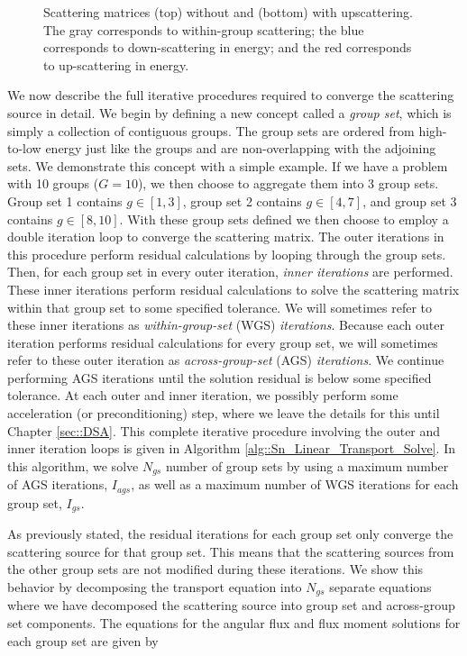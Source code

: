 \begin{figure}
\begin{subfigure}[b]{0.58\textwidth}
	\end{subfigure}
\caption[Scattering matrices with and without upscattering]{Scattering matrices (top) without and (bottom) with upscattering. The gray corresponds to within-group scattering; the blue corresponds to down-scattering in energy; and the red corresponds to up-scattering in energy.}
\label{fig::Sn_Solution_Iterative_scattmatrix}
\end{figure}

We now describe the full iterative procedures required to converge the scattering source in detail. We begin by defining a new concept called a {\em group set}, which is simply a collection of contiguous groups. The group sets are ordered from high-to-low energy just like the groups and are non-overlapping with the adjoining sets. We demonstrate this concept with a simple example. If we have a problem with 10 groups ($G=10$), we then choose to aggregate them into 3 group sets. Group set 1 contains $g \in [1,3]$, group set 2 contains $g \in [4,7]$, and group set 3 contains $g \in [8,10]$. With these group sets defined we then choose to employ a double iteration loop to converge the scattering matrix. The outer iterations in this procedure perform residual calculations by looping through the group sets. Then, for each group set in every outer iteration, {\em inner iterations} are performed. These inner iterations perform residual calculations to solve the scattering matrix within that group set to some specified tolerance. We will sometimes refer to these inner iterations as {\em within-group-set} (WGS) {\em iterations}. Because each outer iteration performs residual calculations for every group set, we will sometimes refer to these outer iteration as {\em across-group-set} (AGS) {\em iterations}. We continue performing AGS iterations until the solution residual is below some specified tolerance. At each outer and inner iteration, we possibly perform some acceleration (or preconditioning) step, where we leave the details for this until Chapter \ref{sec::DSA}. This complete iterative procedure involving the outer and inner iteration loops is given in Algorithm \ref{alg::Sn_Linear_Transport_Solve}. In this algorithm, we solve $N_{gs}$ number of group sets by using a maximum number of AGS iterations, $I_{ags}$, as well as a maximum number of WGS iterations for each group set, $I_{gs}$.

As previously stated, the residual iterations for each group set only converge the scattering source for that group set. This means that the scattering sources from the other group sets are not modified during these iterations. We show this behavior by decomposing the transport equation into $N_{gs}$ separate equations where we have decomposed the scattering source into group set and across-group set components. The equations for the angular flux and flux moment solutions for each group set are given by

